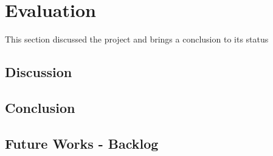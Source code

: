 \chapter{Evaluation}\label{chap:evaluation}
This section discussed the project and brings a conclusion to its status

\section{Discussion}


\section{Conclusion}


\section{Future Works - Backlog}\label{sec:eval:futureworks}
